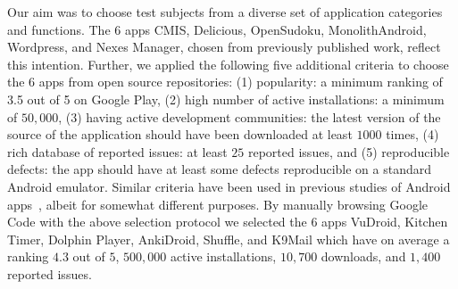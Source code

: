 Our aim was to choose test subjects from a diverse set of application categories and functions. The $6$ apps CMIS, Delicious, OpenSudoku, MonolithAndroid, Wordpress, and Nexes Manager, chosen from previously published work, reflect this intention. Further, we applied the following five additional criteria to choose the $6$ apps from open source repositories: (1) popularity: a minimum ranking of 3.5 out of 5 on Google Play, 
(2) high number of active installations: a minimum of $50{,}000$, (3) having active development communities: the latest version of the source of the application should have been downloaded at least $1000$ times, (4) rich database of reported issues: at least $25$ reported issues, and (5) reproducible defects: the app should have at least some defects reproducible on a standard Android emulator. Similar criteria have been used in previous studies of Android apps~\cite{Hu:2011:AST}, albeit for somewhat different purposes. By manually browsing Google Code with the above selection protocol we selected the $6$ apps VuDroid, Kitchen Timer, Dolphin Player, AnkiDroid, Shuffle, and  K9Mail which have on average a ranking $4.3$ out of $5$, $500{,}000$ active installations, $10{,}700$ downloads, and $1{,}400$ reported issues. 



